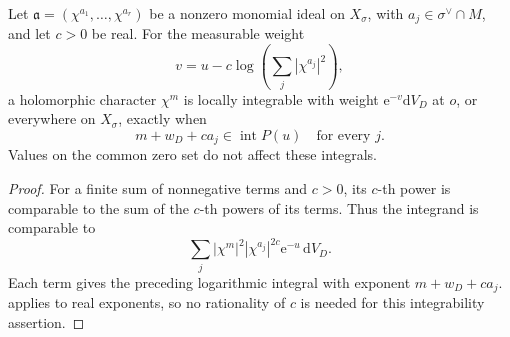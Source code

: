 \begin{corollary}\label{cor:toric-subtracted-ideal-weight}
Let $\mathfrak a=(\chi^{a_1},\ldots,\chi^{a_r})$ be a nonzero monomial ideal on $X_\sigma$, with $a_j\in\sigma^\vee\cap M$, and let $c>0$ be real. For the measurable weight
\[
 v=u-c\log\left(\sum_j|\chi^{a_j}|^2\right),
\]
a holomorphic character $\chi^m$ is locally integrable with weight $\mathrm e^{-v}\mathrm dV_D$ at $o$, or everywhere on $X_\sigma$, exactly when
\[
 m+w_D+ca_j\in\operatorname{int}P(u)
                 \quad\text{for every }j.
\]
Values on the common zero set do not affect these integrals.
\end{corollary}
\begin{proof}
For a finite sum of nonnegative terms and $c>0$, its $c$-th power is comparable to the sum of the $c$-th powers of its terms. Thus the integrand is comparable to
\[
 \sum_j |\chi^m|^2|\chi^{a_j}|^{2c}\mathrm e^{-u}\,\mathrm dV_D.
\]
Each term gives the preceding logarithmic integral with exponent $m+w_D+ca_j$.  applies to real exponents, so no rationality of $c$ is needed for this integrability assertion.
\end{proof}


